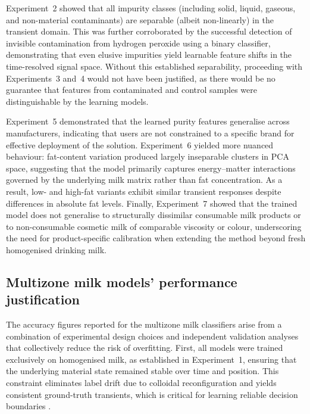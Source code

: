 \documentclass[12pt,a4paper,oneside]{report}
\begin{document}
Experiment~2 showed that all impurity classes (including solid, liquid, gaseous, and non-material contaminants) are separable (albeit non-linearly) in the transient domain. This was further corroborated by the successful detection of invisible contamination from hydrogen peroxide using a binary classifier, demonstrating that even elusive impurities yield learnable feature shifts in the time-resolved signal space. Without this established separability, proceeding with Experiments~3 and~4 would not have been justified, as there would be no guarantee that features from contaminated and control samples were distinguishable by the learning models.

Experiment~5 demonstrated that the learned purity features generalise across manufacturers, indicating that users are not constrained to a specific brand for effective deployment of the solution. Experiment~6 yielded more nuanced behaviour: fat-content variation produced largely inseparable clusters in PCA space, suggesting that the model primarily captures energy--matter interactions governed by the underlying milk matrix rather than fat concentration. As a result, low- and high-fat variants exhibit similar transient responses despite differences in absolute fat levels. Finally, Experiment~7 showed that the trained model does not generalise to structurally dissimilar consumable milk products or to non-consumable cosmetic milk of comparable viscosity or colour, underscoring the need for product-specific calibration when extending the method beyond fresh homogenised drinking milk.

\subsection{Multizone milk models' performance justification}
\label{subsec:multizone_model_performance_justification_chapter6}
%
The accuracy figures reported for the multizone milk classifiers arise from a combination of experimental design choices and independent validation analyses that collectively reduce the risk of overfitting. First, all models were trained exclusively on homogenised milk, as established in Experiment~1, ensuring that the underlying material state remained stable over time and position. This constraint eliminates label drift due to colloidal reconfiguration and yields consistent ground-truth transients, which is critical for learning reliable decision boundaries \cite{walstra1999,michalski2007}.
\end{document}
